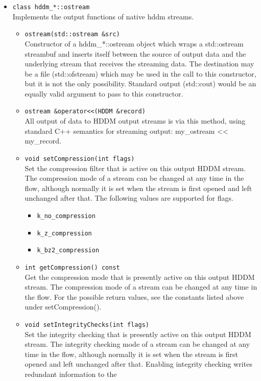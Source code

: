 \documentclass{revtex4}
\begin{document}
\begin{itemize}
\item \texttt{class hddm\_*::ostream}\\
Implements the output functions of native hddm streams.
\begin{itemize}
\item \texttt{ostream(std::ostream \&src)}\\
Constructor of a hddm\_*::ostream object which wraps a std::ostream streambuf
and inserts itself between the source of output data and the underlying stream
that receives the streaming data. The destination may be a file (std::ofstream)
which may be used in the call to this constructor, but it is not the only
possibility. Standard output (std::cout) would be an equally valid argument
to pass to this constructor.
\item \texttt{ostream \&operator<<(HDDM \&record)}\\
All output of data to HDDM output streams is via this method, using standard
C++ semantics for streaming output: my\_ostream << my\_record.
\item \texttt{void setCompression(int flags)}\\
Set the compression filter that is active on this output HDDM stream. The
compression mode of a stream can be changed at any time in the flow, although
normally it is set when the stream is first opened and left unchanged after
that. The following values are supported for flags.
\begin{itemize}
\item \texttt{k\_no\_compression}
\item \texttt{k\_z\_compression}
\item \texttt{k\_bz2\_compression}
\end{itemize}
\item \texttt{int getCompression() const}\\
Get the compression mode that is presently active on this output HDDM stream.
The compression mode of a stream can be changed at any time in the flow. For
the possible return values, see the constants listed above under
setCompression().
\item \texttt{void setIntegrityChecks(int flags)}\\
Set the integrity checking that is presently active on this output HDDM stream.
The integrity checking mode of a stream can be changed at any time in the flow,
although normally it is set when the stream is first opened and left unchanged
after that. Enabling integrity checking writes redundant information to the

\end{itemize}
\end{itemize}
\end{document}
